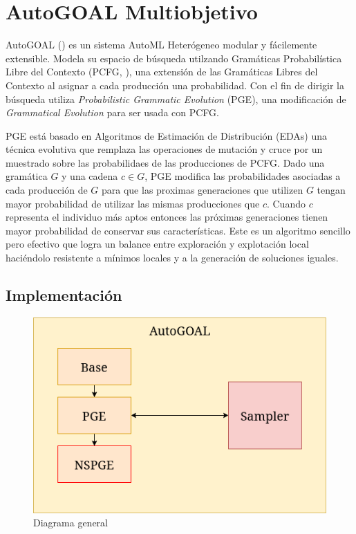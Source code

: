 \chapter{AutoGOAL Multiobjetivo}\label{chapter:implementation}
AutoGOAL (\cite{estevez2020solving}) es un sistema AutoML Heter\'ogeneo modular y f\'acilemente extensible. Modela su espacio de b\'usqueda utilzando Gram\'aticas Probabil\'istica  Libre del Contexto (PCFG, \cite{megane2021probabilistic}), una extensi\'on de las Gram\'aticas Libres del Contexto al asignar a cada producci\'on una probabilidad. Con el fin de dirigir la b\'usqueda utiliza \textit{Probabilistic Grammatic Evolution} (PGE), una modificaci\'on de \textit{Grammatical Evolution}
para ser usada con PCFG.

PGE est\'a basado en Algoritmos de Estimaci\'on de Distribuci\'on (EDAs) una t\'ecnica evolutiva que remplaza las operaciones de mutaci\'on y cruce por un muestrado sobre las probabilidaes de las producciones de PCFG. Dado una gram\'atica $G$ y una cadena $c \in G$, PGE modifica las probabilidades asociadas a cada producci\'on de $G$ para que las proximas generaciones que utilizen $G$ tengan mayor probabilidad de utilizar las mismas producciones que $c$. Cuando $c$ representa el individuo m\'as aptos entonces las pr\'oximas generaciones tienen mayor probabilidad de conservar sus caracter\'isticas.
Este es un algoritmo sencillo pero efectivo que logra un balance entre exploraci\'on y explotaci\'on local haci\'endolo resistente a m\'inimos locales y a la generaci\'on de soluciones iguales.

\section{Implementaci\'on}

\begin{figure}[ht]
    \centering
    \includegraphics[scale=0.6]{Pictures/autogoal_impl.png}
    \caption{Diagrama general}
    \label{impl:fig:general_diagram}
\end{figure}


